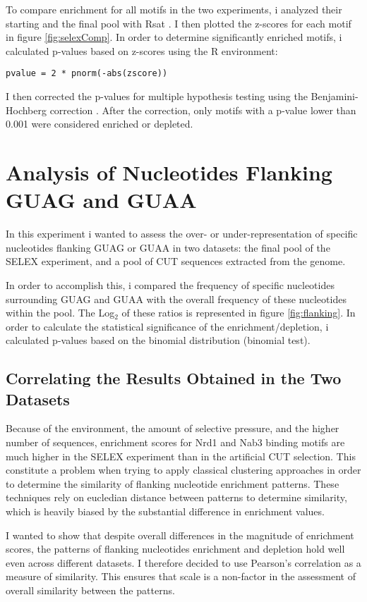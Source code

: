 To compare enrichment for all motifs in the two experiments, i analyzed their starting and the final pool with Rsat \cite{medinarivera:2015:rsat}. I then plotted the z-scores for each motif in figure \ref{fig:selexComp}.
In order to determine significantly enriched motifs, i calculated p-values based on z-scores using the R environment:

\begin{verbatim}
pvalue = 2 * pnorm(-abs(zscore))
\end{verbatim}

I then corrected the p-values for multiple hypothesis testing using the Benjamini-Hochberg correction \cite{hochberg:1990:more}. After the correction, only motifs with a p-value lower than 0.001 were considered enriched or depleted.

\section*{Analysis of Nucleotides Flanking GUAG and GUAA}

In this experiment i wanted to assess the over- or under-representation of specific nucleotides flanking GUAG or GUAA in two datasets: the final pool of the SELEX experiment, and a pool of CUT sequences extracted from the genome. 

In order to accomplish this, i compared the frequency of specific nucleotides surrounding GUAG and GUAA with the overall frequency of these nucleotides within the pool. 
The Log$_2$ of these ratios is represented in figure \ref{fig:flanking}. 
In order to calculate the statistical significance of the enrichment/depletion, i calculated p-values based on the binomial distribution (binomial test).

\subsection*{Correlating the Results Obtained in the Two Datasets}

Because of the environment, the amount of selective pressure, and the higher number of sequences, enrichment scores for Nrd1 and Nab3 binding motifs are much higher in the SELEX experiment than in the artificial CUT selection. This constitute a problem when trying to apply classical clustering approaches in order to determine the similarity of flanking nucleotide enrichment patterns. These techniques rely on eucledian distance between patterns to determine similarity, which is heavily biased by the substantial difference in enrichment values.

I wanted to show that despite overall differences in the magnitude of enrichment scores, the patterns of flanking nucleotides enrichment and depletion hold well even across different datasets. I therefore decided to use Pearson's correlation as a measure of similarity. This ensures that scale is a non-factor in the assessment of overall similarity between the patterns.